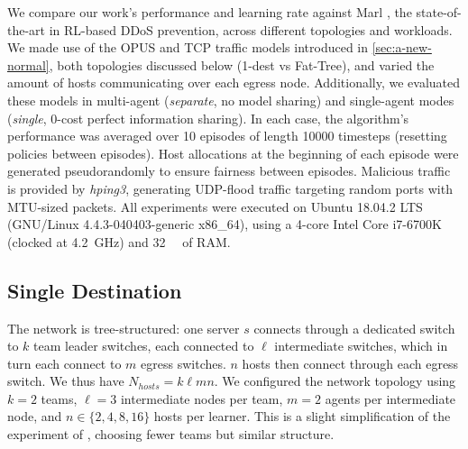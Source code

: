 \documentclass[10pt, times, conference, letterpaper]{IEEEtran}
\begin{document}

We compare our work's performance and learning rate against Marl \cite{DBLP:journals/eaai/MalialisK15}, the state-of-the-art in RL-based DDoS prevention, across different topologies and workloads.
We made use of the OPUS and TCP traffic models introduced in \cref{sec:a-new-normal}, both topologies discussed below (1-dest vs Fat-Tree), and varied the amount of hosts communicating over each egress node.
Additionally, we evaluated these models in multi-agent (\emph{separate}, no model sharing) and single-agent modes (\emph{single}, 0-cost perfect information sharing).
In each case, the algorithm's performance was averaged over \num{10} episodes of length \num{10000} timesteps (resetting policies between episodes).
Host allocations at the beginning of each episode were generated pseudorandomly to ensure fairness between episodes.
Malicious traffic is provided by \emph{hping3}, generating UDP-flood traffic targeting random ports with MTU-sized packets.
All experiments were executed on Ubuntu 18.04.2 LTS (GNU/Linux 4.4.3-040403-generic x86\_64), using a 4-core Intel Core i7-6700K (clocked at \SI{4.2}{\giga\hertz}) and \SI{32}{\gibi\byte} of RAM.

\subsection{Single Destination}\label{sec:single-dest}
The network is tree-structured: one server $s$ connects through a dedicated switch to $k$ team leader switches, each connected to $\ell$ intermediate switches, which in turn each connect to $m$ egress switches.
$n$ hosts then connect through each egress switch.
We thus have $N_{\mathit{hosts}} = k \ell m n$.
We configured the network topology using $k=2$ teams, $\ell=3$ intermediate nodes per team, $m=2$ agents per intermediate node, and $n \in \{2, 4, 8, 16\}$ hosts per learner.
This is a slight simplification of the  experiment of \textcite{DBLP:journals/eaai/MalialisK15}, choosing fewer teams but similar structure.
\end{document}
